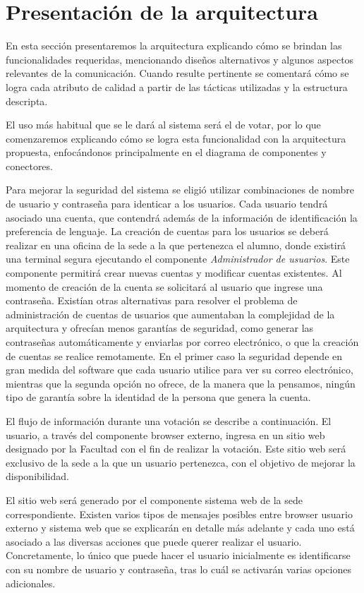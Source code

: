 \section{Presentación de la arquitectura}

En esta sección presentaremos la arquitectura explicando cómo se brindan las funcionalidades requeridas, mencionando diseños alternativos y algunos aspectos relevantes de la comunicación. Cuando resulte pertinente se comentará cómo se logra cada atributo de calidad a partir de las tácticas utilizadas y la estructura descripta. 


El uso más habitual que se le dará al sistema será el de votar, por lo que comenzaremos explicando cómo se logra esta funcionalidad con la arquitectura propuesta, enfocándonos principalmente en el diagrama de componentes y conectores.

Para mejorar la seguridad del sistema se eligió utilizar combinaciones de nombre de usuario y contraseña para identicar a los usuarios. Cada usuario tendrá asociado una cuenta, que contendrá además de la información de identificación la preferencia de lenguaje. La creación de cuentas para los usuarios se deberá realizar en una oficina de la sede a la que pertenezca el alumno, donde existirá una terminal segura ejecutando el componente \emph{Administrador de usuarios}. Este componente permitirá crear nuevas cuentas y modificar cuentas existentes. Al momento de creación de la cuenta se solicitará al usuario que ingrese una contraseña. Existían otras alternativas para resolver el problema de administración de cuentas de usuarios que aumentaban la complejidad de la arquitectura y ofrecían menos garantías de seguridad, como generar las contraseñas automáticamente y enviarlas por correo electrónico, o que la creación de cuentas se realice remotamente. En el primer caso la seguridad depende en gran medida del software que cada usuario utilice para ver su correo electrónico, mientras que la segunda opción no ofrece, de la manera que la pensamos, ningún tipo de garantía sobre la identidad de la persona que genera la cuenta.

El flujo de información durante una votación se describe a continuación. El usuario, a través del componente browser externo, ingresa en un sitio web designado por la Facultad con el fin de realizar la votación.  Este sitio web será exclusivo de la sede a la que un usuario pertenezca, con el objetivo de mejorar la disponibilidad. 

El sitio web será generado por el componente sistema web de la sede correspondiente. Existen varios tipos de mensajes posibles entre browser usuario externo y sistema web que se explicarán en detalle más adelante 
y cada uno está asociado a las diversas acciones que puede querer realizar el usuario. Concretamente, lo único que puede hacer el usuario inicialmente es identificarse con su nombre de usuario y contraseña, tras lo cuál se activarán varias opciones adicionales.

